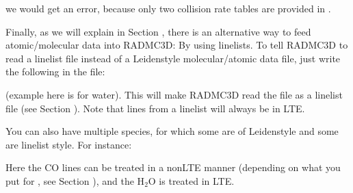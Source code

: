 \documentclass[letterpaper,10pt,english]{sphinxmanual}
\begin{document}
we would get an error, because only two collision rate tables are
provided in .

Finally, as we will explain in Section {\hyperref[\detokenize{lineradtrans:sec-linelist-xxx-inp}]{}}, there
is an alternative way to feed atomic/molecular data into RADMC\sphinxhyphen{}3D: By using
linelists. To tell RADMC\sphinxhyphen{}3D to read a linelist file instead of a Leiden\sphinxhyphen{}style
molecular/atomic data file, just write the following in the 
file:

\begin{sphinxVerbatim}[commandchars=\\\{\}]
         
\end{sphinxVerbatim}

(example here is for water). This will make RADMC\sphinxhyphen{}3D read the
 file as a linelist file (see Section
{\hyperref[\detokenize{lineradtrans:sec-linelist-xxx-inp}]{}}). Note that lines from a linelist will always be in
LTE.

You can also have multiple species, for which some are of Leiden\sphinxhyphen{}style and some
are linelist style. For instance:

\begin{sphinxVerbatim}[commandchars=\\\{\}]
            
         
\end{sphinxVerbatim}

Here the CO lines can be treated in a non\sphinxhyphen{}LTE manner (depending on what you put
for , see Section {\hyperref[\detokenize{lineradtrans:sec-line-trans-modes}]{}}), and the
H$_{\text{2}}$O is treated in LTE.
\end{document}
